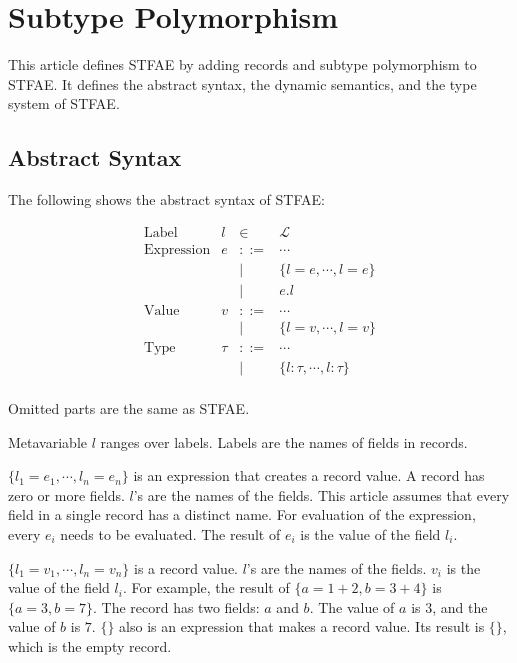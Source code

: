 \setchapterpreamble[u]{\margintoc}
\chapter{Subtype Polymorphism}

\renewcommand{\plang}{\textsf{TFAE}\xspace}
\renewcommand{\lang}{\textsf{STFAE}\xspace}

This article defines \lang by adding records and subtype polymorphism to \lang.
It defines the abstract syntax, the dynamic semantics, and the type system of
\lang.

\section{Abstract Syntax}

The following shows the abstract syntax of \lang:

\[
\begin{array}{rrcl}
\text{Label} & l & \in & \mathcal{L} \\
\text{Expression} & e & ::= & \cdots \\
&&|& \{l=e,\cdots,l=e\} \\
&&|& e.l \\
\text{Value} & v & ::= & \cdots \\
&&|& \{l=v,\cdots,l=v\} \\
\text{Type} & \tau & ::= & \cdots \\
&&|& \{l:\tau,\cdots,l:\tau\} \\
\end{array}
\]

Omitted parts are the same as \lang.

Metavariable $l$ ranges over labels. Labels are the names of fields in
records.

$\{l_1=e_1,\cdots,l_n=e_n\}$ is an expression that creates a record value. A
record has zero or more fields. $l$'s are the names of the fields. This
article assumes that every field in a single record has a distinct name. For
evaluation of the expression, every $e_i$ needs to be evaluated. The result of
$e_i$ is the value of the field $l_i$.

$\{l_1=v_1,\cdots,l_n=v_n\}$ is a record value. $l$'s are the names of the
fields. $v_i$ is the value of the field $l_i$. For example, the result of
$\{a=1+2,b=3+4\}$ is $\{a=3,b=7\}$. The record has two fields: $a$ and
$b$. The value of $a$ is $3$, and the value of $b$ is $7$. $\{\}$
also is an expression that makes a record value. Its result is $\{\}$, which
is the empty record.

